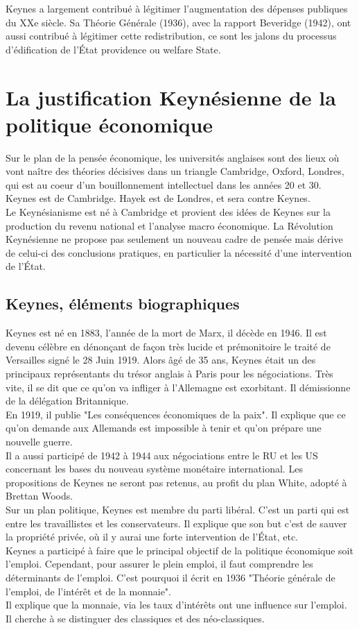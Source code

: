 \documentclass[10pt, a4paper, openany]{book}
\begin{document}
Keynes a largement contribué à légitimer l'augmentation des dépenses publiques du XXe siècle. Sa Théorie Générale (1936), avec la rapport Beveridge (1942), ont aussi contribué à légitimer cette redistribution, ce sont les jalons du processus d'édification de l'État providence ou welfare State. 

\section{La justification Keynésienne de la politique économique}

Sur le plan de la pensée économique, les universités anglaises sont des lieux où vont naître des théories décisives dans un triangle Cambridge, Oxford, Londres, qui est au coeur d'un bouillonnement intellectuel dans les années 20 et 30. Keynes est de Cambridge. Hayek est de Londres, et sera contre Keynes. \\
Le Keynésianisme est né à Cambridge et provient des idées de Keynes sur la production du revenu national et l'analyse macro économique. La Révolution Keynésienne ne propose pas seulement un nouveau cadre de pensée mais dérive de celui-ci des conclusions pratiques, en particulier la nécessité d'une intervention de l'État. 

\subsection{Keynes, éléments biographiques}

Keynes est né en 1883, l'année de la mort de Marx, il décède en 1946. Il est devenu célèbre en dénonçant de façon très lucide et prémonitoire le traité de Versailles signé le 28 Juin 1919. Alors âgé de 35 ans, Keynes était un des principaux représentants du trésor anglais à Paris pour les négociations. Très vite, il se dit que ce qu'on va infliger à l'Allemagne est exorbitant. Il démissionne de la délégation Britannique. \\
En 1919, il publie "Les conséquences économiques de la paix". Il explique que ce qu'on demande aux Allemands est impossible à tenir et qu'on prépare une nouvelle guerre. \\
Il a aussi participé de 1942 à 1944 aux négociations entre le RU et les US concernant les bases du nouveau système monétaire international. Les propositions de Keynes ne seront pas retenus, au profit du plan White, adopté à Brettan Woods. \\
Sur un plan politique, Keynes est membre du parti libéral. C'est un parti qui est entre les travaillistes et les conservateurs. Il explique que son but c'est de sauver la propriété privée, où il y aurai une forte intervention de l'État, etc. \\
Keynes a participé à faire que le principal objectif de la politique économique soit l'emploi. Cependant, pour assurer le plein emploi, il faut comprendre les déterminants de l'emploi. C'est pourquoi il écrit en 1936 "Théorie générale de l'emploi, de l'intérêt et de la monnaie". \\
Il explique que la monnaie, via les taux d'intérêts ont une influence sur l'emploi. Il cherche à se distinguer des classiques et des néo-classiques. 
\end{document}
